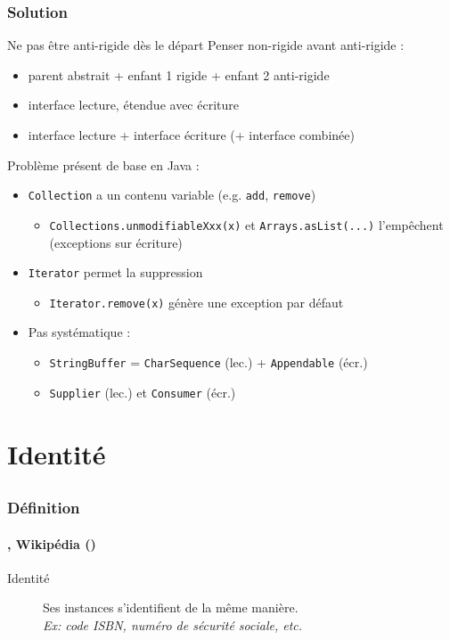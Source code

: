 \documentclass[draft]{beamer}
\DeclareRobustCommand{\todo}[1]{\ifdraft{\textbf{\textcolor{red}{[#1]}}}{}}
\newcommand{\citecustom}[2]{#2 (\citeyear{#1})}
\begin{document}
\begin{frame}
\frametitle{Solution}
\begin{exampleblock}{Ne pas être anti-rigide dès le départ}
 Penser non-rigide avant anti-rigide :
 \begin{itemize}
  \item parent abstrait + enfant 1 rigide + enfant 2 anti-rigide
  \item interface lecture, étendue avec écriture
  \item interface lecture + interface écriture (+ interface combinée)
 \end{itemize}
\end{exampleblock}
Problème présent de base en Java :
\begin{itemize}
 \item \lstinline{Collection} a un contenu variable (e.g. \lstinline{add}, \lstinline{remove})
 \begin{itemize}
  \item \lstinline{Collections.unmodifiableXxx(x)} et \lstinline{Arrays.asList(...)} l'empêchent (exceptions sur écriture)
 \end{itemize}
 \item \lstinline{Iterator} permet la suppression
 \begin{itemize}
  \item \lstinline{Iterator.remove(x)} génère une exception par défaut
 \end{itemize}
 \item Pas systématique :
 \begin{itemize}
  \item \lstinline{StringBuffer} = \lstinline{CharSequence} (lec.) + \lstinline{Appendable} (écr.)
  \item \lstinline{Supplier} (lec.) et \lstinline{Consumer} (écr.)
 \end{itemize}
\end{itemize}
\end{frame}

\section{Identité}
\subsection{}

\begin{frame}
\frametitle{Définition}
\framesubtitle{\cite{goos_ontological_2000,staab_overview_2004}, \citecustom{noauthor_ontoclean_2019}{Wikipédia}}
\begin{description}
 \item[Identité] Ses instances s'identifient de la même manière.\\
      {\footnotesize\textit{Ex: code ISBN, numéro de sécurité sociale, etc.}}
\end{description}
\todo{...}
\end{frame}
\end{document}
